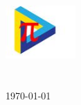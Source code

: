 \documentclass[
12pt, %
english, %
singlespacing, %
oneside,
headsepline, %
]{MastersDoctoralThesis} %
\begin{document}
\begin{titlepage}
\begin{center}
\includegraphics[width=0.2\textwidth]{images/faclogo.jpg}\\[0.5cm]
\facname\\\deptname\\[2cm]
\vfill
{\large \today}\\[4cm]

\vfill
\end{center}
\end{titlepage}


\tableofcontents %
\listoffigures %

\end{document}
